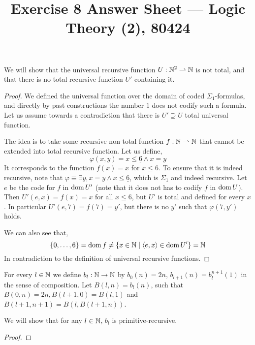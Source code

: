 
\title{Exercise 8 Answer Sheet --- Logic Theory (2), 80424}

\DeclareMathOperator{\PA}{PA}
\DeclareMathOperator{\Coll}{Coll}
\DeclareMathOperator{\Ind}{Ind}
\DeclareMathOperator{\Sat}{Sat}


\maketitle
\maketitleprint[yellow]

\question[2]
We will show that the universal recursive function $U : \mathbb{N}^2 \rightharpoonup \mathbb{N}$ is not total,
and that there is no total recursive function $U'$ containing it.
\begin{proof}
	We defined the universal function over the domain of coded $\Sigma_1$-formulas, and directly by past constructions the number $1$ does not codify such a formula.
	Let us assume towards a contradiction that there is $U' \supseteq U$ total universal function.

	The idea is to take some recursive non-total function $f : \mathbb{N} \rightharpoonup \mathbb{N}$ that cannot be extended into total recursive function.
	Let us define,
	\[
		\varphi(x, y) = x \le \underline{6} \land x = y
	\]
	It corresponds to the function $f(x) = x$ for $x \le 6$.
	To ensure that it is indeed recursive, note that $\varphi \equiv \exists y, x = y \land x \le \underline{6}$, which is $\Sigma_1$ and indeed recursive.
	Let $e$ be the code for $f$ in $\operatorname{dom} U'$ (note that it does not has to codify $f$ in $\operatorname{dom} U$).
	Then $U'(e, x) = f(x) = x$ for all $x \le 6$, but $U'$ is total and defined for every $x$.
	In particular $U'(e, 7) = f(7) = y'$, but there is no $y'$ such that $\varphi(7, y')$ holds.

	We can also see that,
	\[
		\{0, \ldots, 6\}
		= \operatorname{dom} f
		\ne \{ x \in \mathbb{N} \mid \langle e, x \rangle \in \operatorname{dom} U' \}
		= \mathbb{N}
	\]
	In contradiction to the definition of universal recursive functions.
\end{proof}

\question{}
For every $l \in \mathbb{N}$ we define $b_l : \mathbb{N} \to \mathbb{N}$ by $b_0(n) = 2n$, $b_{l + 1}(n) = b_l^{n + 1}(1)$ in the sense of composition.
Let $B(l, n) = b_l(n)$, such that $B(0, n) = 2n, B(l + 1, 0) = B(l, 1)$ and $B(l + 1, n + 1) = B(l, B(l + 1, n))$.

\subquestion{}
We will show that for any $l \in \mathbb{N}$, $b_l$ is primitive-recursive.
\begin{proof}
	
\end{proof}


